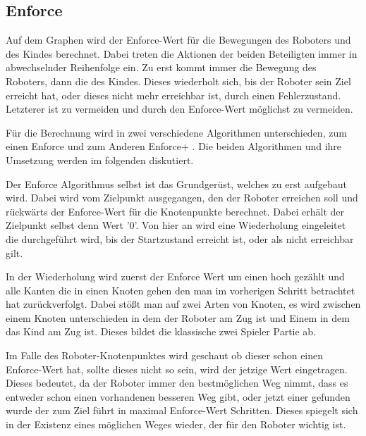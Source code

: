 \subsection{Enforce}
Auf dem Graphen wird der Enforce-Wert für die Bewegungen des Roboters und des Kindes berechnet. Dabei treten die Aktionen der beiden Beteiligten immer in abwechselnder Reihenfolge ein. Zu erst kommt immer die Bewegung des Roboters, dann die des Kindes. Dieses wiederholt sich, bis der Roboter sein Ziel erreicht hat, oder dieses nicht mehr erreichbar ist, durch einen Fehlerzustand. Letzterer ist zu vermeiden und durch den Enforce-Wert möglichst zu vermeiden. \par
Für die Berechnung wird in zwei verschiedene Algorithmen unterschieden, zum einen Enforce und zum Anderen Enforce+ . Die beiden Algorithmen und ihre Umsetzung werden im folgenden diskutiert. \par
Der Enforce Algorithmus selbst ist das Grundgerüst, welches zu erst aufgebaut wird. Dabei wird vom Zielpunkt ausgegangen, den der Roboter erreichen soll und rückwärts der Enforce-Wert für die Knotenpunkte berechnet. Dabei erhält der Zielpunkt selbst denn Wert '0'. Von hier an wird eine Wiederholung eingeleitet die durchgeführt wird, bis der Startzustand erreicht ist, oder als nicht erreichbar gilt. \par
In der Wiederholung wird zuerst der Enforce Wert um einen hoch gezählt und alle Kanten die in einen Knoten gehen den man im vorherigen Schritt betrachtet hat zurückverfolgt. Dabei stößt man auf zwei Arten von Knoten, es wird zwischen einem Knoten unterschieden in dem der Roboter am Zug ist und Einem in dem das Kind am Zug ist. Dieses bildet die klassische zwei Spieler Partie ab. \par
Im Falle des Roboter-Knotenpunktes wird geschaut ob dieser schon einen Enforce-Wert hat, sollte dieses nicht so sein, wird der jetzige Wert eingetragen. Dieses bedeutet, da der Roboter immer den bestmöglichen Weg nimmt, dass es entweder schon einen vorhandenen besseren Weg gibt, oder jetzt einer gefunden wurde der zum Ziel führt in maximal Enforce-Wert Schritten. Dieses spiegelt sich in der Existenz eines möglichen Weges wieder, der für den Roboter wichtig ist. \par
